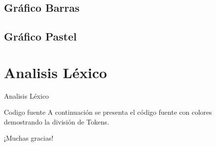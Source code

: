 \documentclass[10pt,xcolor={dvipsnames}]{beamer}
\begin{document}
    \subsection{Gráfico Barras}
            
    \subsection{Gráfico Pastel}
        
    
    \section{Analisis Léxico}
        \begin{frame}{Analisis Léxico}
        \begin{alertblock}{Codigo fuente}
            A continuación se presenta el código fuente con colores demostrando la división de Tokens.
            \end{alertblock}
        \end{frame}

        


    {
        \begin{frame}[standout]
            \begin{center}
              ¡Muchas gracias!
            \end{center}
        \end{frame}
    }
\end{document}
